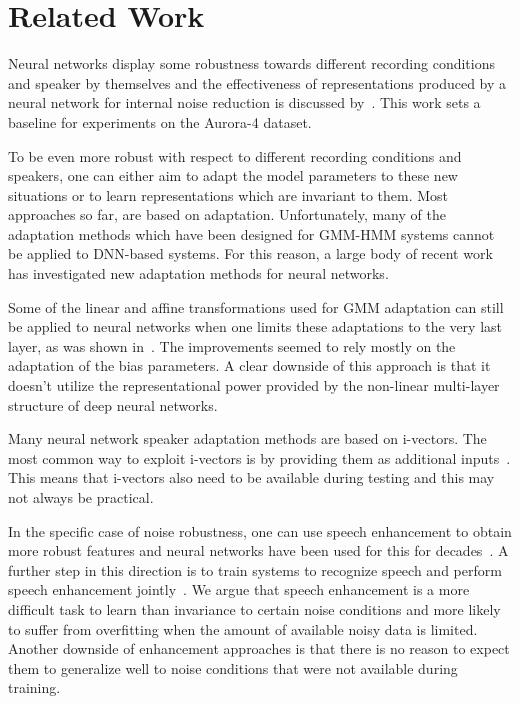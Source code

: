 \documentclass[a4paper]{article}
\begin{document}
\section{Related Work}
\label{sec:relatedwork}
    Neural networks display some robustness towards different recording
    conditions and speaker by themselves and the effectiveness of representations
    produced by a neural network for internal 
    noise reduction is discussed by~\cite{yu2013feature}. This work sets a 
    baseline for experiments on the Aurora-4 dataset.

    To be even more robust with respect to different recording conditions and speakers,
    one can either aim to adapt the model parameters to these new situations or
    to learn representations which are invariant to them.
    Most approaches so far, are based on adaptation.
    Unfortunately, many of the adaptation methods which have been designed for
    GMM-HMM systems cannot be applied to DNN-based systems. For this reason, a
    large body of recent work has investigated new adaptation methods for neural
    networks.

    Some of the linear and affine transformations used for GMM adaptation can
    still be applied to neural networks when one limits these adaptations to the
    very last layer, as was shown in~\cite{yao2012adaptation}. The
    improvements seemed to rely mostly on the adaptation of the bias parameters.
    A clear downside of this approach is that it doesn't utilize the
    representational power provided by the non-linear multi-layer structure of deep
    neural networks.

    Many neural network speaker adaptation methods are based on
    i-vectors. The most common way to exploit i-vectors is by providing them as additional
    inputs~\citep{senior2014improving,saon2013speaker}. This means that i-vectors also need to
    be available during testing and this may not always be practical.

    In the specific case of noise robustness, one can use speech enhancement to
    obtain more robust features and neural networks have been used for this for
    decades~\citep{knecht1995neural}. A further step in this direction is to train
    systems to recognize speech and perform speech enhancement jointly~\citep{narayanan2014joint}. 
    We argue that speech enhancement is a more difficult task to learn than
    invariance to certain noise conditions and more likely to suffer from
    overfitting when the amount of available noisy data is limited.
    Another downside of enhancement approaches is that there is no reason to
    expect them to generalize well to noise conditions that were not available during
    training.
\end{document}

